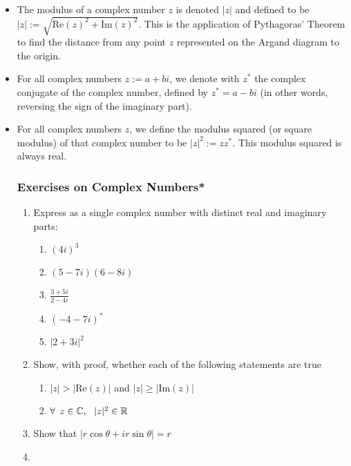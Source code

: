 \begin{itemize}
    \item The modulus of a complex number $z$ is denoted $|z|$ and defined to be $|z|:=\sqrt{\text{Re}(z)^2+\text{Im}(z)^2}$. This is the application of Pythagoras' Theorem to find the distance from any point $z$ represented on the Argand diagram to the origin.
    \item For all complex numbers $z:=a+bi$, we denote with $z^{\ast}$ the complex conjugate of the complex number, defined by $z^{\ast}=a-bi$ (in other words, reversing the sign of the imaginary part).
    \item For all complex numbers $z$, we define the modulus squared (or square modulus) of that complex number to be $|z|^{2}:=zz^{\ast}$. This modulus squared is always real.
\subsubsection{Exercises on Complex Numbers*}
\begin{enumerate}
    \item Express as a single complex number with distinct real and imaginary parts:\begin{enumerate}
    \item $(4i)^3$ \\
    \item $(5-7i)(6-8i)$ \\
    \item $\frac{3+5i}{2-4i}$ \\
    \item $(-4-7i)^{\ast}$ \\
    \item $|2+3i|^2$ \\
    \end{enumerate}
    \item Show, with proof, whether each of the following statements are true \begin{enumerate}
        \item $|z|>|\text{Re}(z)|$ and $|z|\geq|\text{Im}(z)|$
        \\
        \item $\forall\:\: z\in\mathbb{C}, \:\:\: |z|^2\in\mathbb{R}$ \\
    \end{enumerate}
    \item Show that $|r\cos\theta+ir\sin\theta|=r$ \\
    \item 
\end{enumerate}
\end{itemize}
